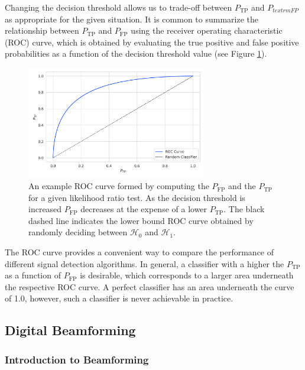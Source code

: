 Changing the decision threshold allows us to trade-off between $P_{\textrm{TP}}$ and $P_{textrm{FP}}$ as appropriate for the given situation. It is common to summarize the relationship between $P_{\textrm{TP}}$ and $P_{\textrm{FP}}$ using the receiver operating characteristic (ROC) curve, which is obtained by evaluating the true positive and false positive probabilities as a function of the decision threshold value (see Figure \ref{fig:chap4-example-roc-curve}).
\begin{figure}[htbp]
    \centering
    \includegraphics*[width=0.7\textwidth]{figs/Chapter-4/230603_roc_curve_example.png}
    \caption{\label{fig:chap4-example-roc-curve} An example ROC curve formed by computing the $P_\mathrm{FP}$ and the $P_\mathrm{TP}$ for a given likelihood ratio test. As the decision threshold is increased $P_\mathrm{FP}$ decreases at the expense of a lower $P_\mathrm{TP}$. The black dashed line indicates the lower bound ROC curve obtained by randomly deciding between $\mathcal{H}_0$ and $\mathcal{H}_1$. }
\end{figure}
The ROC curve provides a convenient way to compare the performance of different signal detection algorithms. In general, a classifier with a higher the $P_\mathrm{TP}$ as a function of $P_\mathrm{FP}$ is desirable, which corresponds to a larger area underneath the respective ROC curve. A perfect classifier has an area underneath the curve of 1.0, however, such a classifier is never achievable in practice. 



\subsection{Digital Beamforming}
\label{sec:chap4-dig-bf}

\subsubsection*{Introduction to Beamforming}

